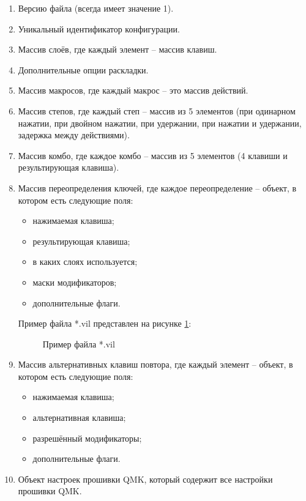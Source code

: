 \begin{enumerate}
\item Версию файла (всегда имеет значение 1).
\item Уникальный идентификатор конфигурации.
\item Массив слоёв, где каждый элемент -- массив клавиш.
\item Дополнительные опции раскладки.
\item Массив макросов, где каждый макрос -- это массив действий.
\item Массив степов, где каждый степ -- массив из 5 элементов (при одинарном нажатии, при двойном нажатии, при удержании, при нажатии и удержании, задержка между действиями).
\item Массив комбо, где каждое комбо -- массив из 5 элементов (4 клавиши и результирующая клавиша).
\item Массив переопределения ключей, где каждое переопределение -- объект, в котором есть следующие поля:

\begin{itemize}
	\item нажимаемая клавиша;
	\item результирующая клавиша;
	\item в каких слоях используется;
	\item маски модификаторов;
	\item дополнительные флаги.
\end{itemize}

Пример файла *.vil представлен на рисунке \ref{vilfile:image}:

\begin{figure}[H]
	
	\caption{Пример файла *.vil}
	\label{vilfile:image}
\end{figure}

\item Массив альтернативных клавиш повтора, где каждый элемент -- объект, в котором есть следующие поля:

\begin{itemize}
	\item нажимаемая клавиша;
	\item альтернативная клавиша;
	\item разрешённый модификаторы;
	\item дополнительные флаги.
\end{itemize}

\item Объект настроек прошивки QMK, который содержит все настройки прошивки QMK.
\end{enumerate}

